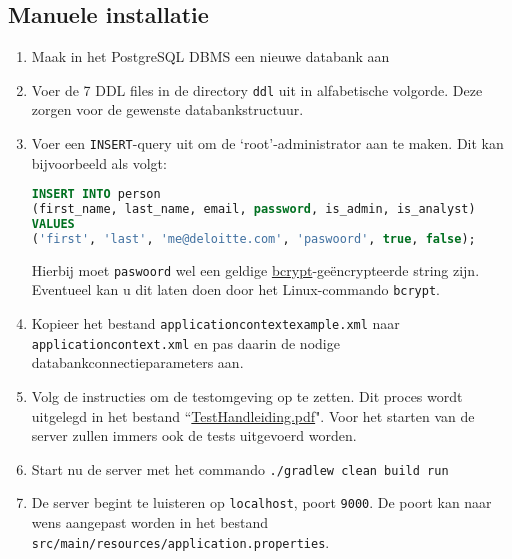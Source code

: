 \documentclass[a4paper,11pt]{article}
\begin{document}
	\subsection*{Manuele installatie}
	\begin{enumerate}
		\item Maak in het PostgreSQL DBMS een nieuwe databank aan
		\item Voer de 7 DDL files in de directory \texttt{ddl} uit in alfabetische volgorde. Deze zorgen voor de gewenste databankstructuur.
		\item Voer een \texttt{INSERT}-query uit om de `root'-administrator aan te maken. Dit kan bijvoorbeeld als volgt:
			\begin{lstlisting}[frame=single, language=SQL, breaklines=true]
INSERT INTO person
(first_name, last_name, email, password, is_admin, is_analyst)
VALUES
('first', 'last', 'me@deloitte.com', 'paswoord', true, false);
			\end{lstlisting}
			Hierbij moet \texttt{paswoord} wel een geldige \hyperlink{http://bcrypt.sourceforge.net/}{bcrypt}-ge\"encrypteerde string zijn. Eventueel kan u dit laten doen door het Linux-commando \texttt{bcrypt}.
		\item Kopieer het bestand \texttt{application\-context\-example.xml} naar \texttt{application\-context.xml} en pas daarin de nodige databankconnectieparameters aan.
		\item Volg de instructies om de testomgeving op te zetten. Dit proces wordt uitgelegd in het bestand ``\href{run:TestHandleiding.pdf}{TestHandleiding.pdf}". Voor het starten van de server zullen immers ook de tests uitgevoerd worden.
		\item Start nu de server met het commando \texttt{./gradlew clean build run}
		\item De server begint te luisteren op \texttt{localhost}, poort \texttt{9000}. De poort kan naar wens aangepast worden in het bestand \texttt{src/main/resources/application.properties}.
	\end{enumerate}
\end{document}
